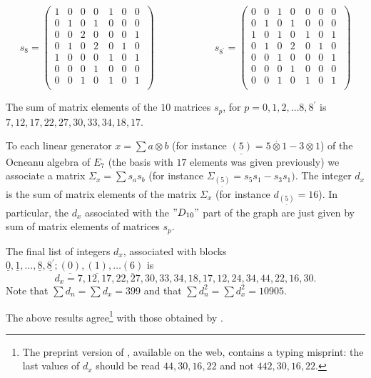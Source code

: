 \documentclass[a4paper,11pt]{article}
\def \otimesdot {\stackrel{\cdot}{\otimes}}
\newcommand{\ud}[1]{\underline{#1}}
\begin{document}
{$$
s_8 = \left( \begin{array}{ccccccc}
   1 & 0 & 0 & 0 & 1 & 0 & 0 \\ 0 & 1 & 0 & 1 & 0 & 0 & 0 \\ 0 & 0 & 2 & 0 \
& 0 & 0 & 1 \\ 0 & 1 & 0 & 2 & 0 & 1 & 0 \\ 1 & 0 & 0 & 0 & 1 & 0 & 1 \
\\ 0 & 0 & 0 & 1 & 0 & 0 & 0 \\ 0 & 0 & 1 & 0 & 1 & 0 & 1 \\
\end{array}
\right)
\qquad \qquad \qquad
s_{8^{'}} = \left( \begin{array}{ccccccc}
   0 & 0 & 1 & 0 & 0 & 0 & 0 \\ 0 & 1 & 0 & 1 & 0 & 0 & 0 \\ 1 & 0 & 1 & 0 \
& 1 & 0 & 1 \\ 0 & 1 & 0 & 2 & 0 & 1 & 0 \\ 0 & 0 & 1 & 0 & 0 & 0 & 1 \
\\ 0 & 0 & 0 & 1 & 0 & 0 & 0 \\ 0 & 0 & 1 & 0 & 1 & 0 & 1 \\
\end{array}
\right)
$$
}

The sum of matrix elements of the $10$ matrices $s_{p}$, for
$p = 0,1,2,\ldots 8, 8^{'}$ is \\
$7,12,17,22,27,30,33,34,18,17$.

To each linear generator $x = \sum a \otimes b$ (for instance $\ud{(5)} =
5\otimesdot 1 - 3 \otimesdot 1$) of the Ocneanu algebra of $E_{7}$ (the
basis with $17$ elements was given previously) we associate
a matrix $\Sigma_{x} = \sum s_{a}s_{b}$ (for instance
$\Sigma_{\ud{(5)}} = s_{5}s_{1} - s_{3}s_{1})$.  The integer $d_{x}$
is the sum of matrix elements of the matrix $\Sigma_{x}$ (for
instance $d_{\ud{(5)}} = 16$). In particular, the $d_{x}$ associated
with the $"D_{10}"$ part of the graph are just given by sum of
matrix elements of matrices $s_{p}$.

The final list of integers $d_{x}$, associated with blocks
$\ud{0},\ud{1},\ldots, \ud{8},\ud{8^{'}}; \ud{(0)}, \ud{(1)},\ldots \ud{(6)}$
is
$$
d_x = 7,12,17,22,27,30,33,34,18,17,12,24,34,44,22,16,30.
$$
Note that $\sum d_{n} = \sum d_{x} = 399$ and that  $\sum d_{n}^2 = \sum
d_{x}^2 = 10905$.

The above results agree\footnote{The preprint version of \cite{PetZub:Oc},
available on
the web, contains a typing misprint: the last values of $d_{x}$ should be
read $44,30,16,22$ and not $442, 30, 16, 22$.}
with those obtained by \cite{PetZub:Oc}.
\end{document}
